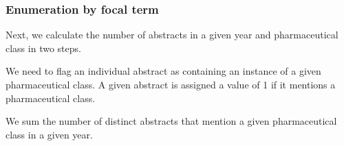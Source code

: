 \documentclass[
]{article}
\newenvironment{Shaded}{\begin{snugshade}}{\end{snugshade}}
\newcommand{\CommentTok}[1]{\textcolor[rgb]{0.56,0.35,0.01}{\textit{#1}}}
\newcommand{\DataTypeTok}[1]{\textcolor[rgb]{0.13,0.29,0.53}{#1}}
\newcommand{\DecValTok}[1]{\textcolor[rgb]{0.00,0.00,0.81}{#1}}
\newcommand{\KeywordTok}[1]{\textcolor[rgb]{0.13,0.29,0.53}{\textbf{#1}}}
\newcommand{\NormalTok}[1]{#1}
\newcommand{\OperatorTok}[1]{\textcolor[rgb]{0.81,0.36,0.00}{\textbf{#1}}}
\newcommand{\StringTok}[1]{\textcolor[rgb]{0.31,0.60,0.02}{#1}}
\begin{document}
\hypertarget{enumeration-by-focal-term}{%
\subsubsection{Enumeration by focal
term}\label{enumeration-by-focal-term}}

Next, we calculate the number of abstracts in a given year and
pharmaceutical class in two steps.

We need to flag an individual abstract as containing an instance of a
given pharmaceutical class. A given abstract is assigned a value of 1 if
it mentions a pharmaceutical class.

\begin{Shaded}
\end{Shaded}

We sum the number of distinct abstracts that mention a given
pharmaceutical class in a given year.
\end{document}
